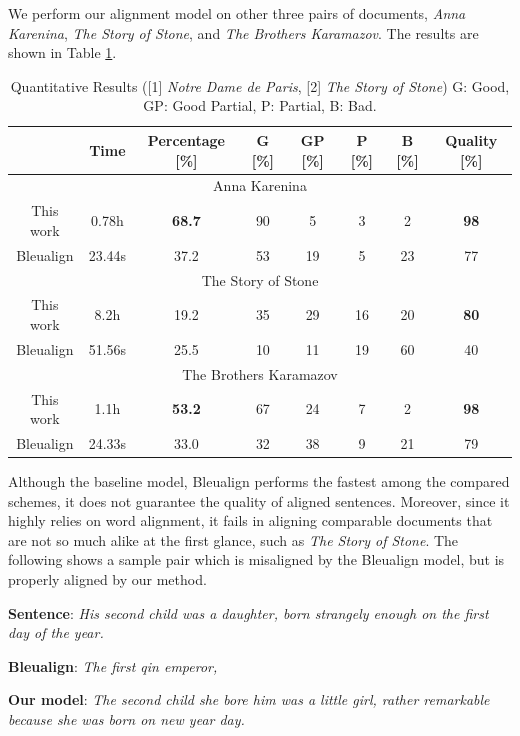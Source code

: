 \documentclass[runningheads]{llncs}
\begin{document}
\begin{spacing}{1.1}
We perform our alignment model on other three pairs of documents, \emph{Anna Karenina}, \emph{The Story of Stone}, and \emph{The Brothers Karamazov}. The results are shown in Table \ref{tb:8}.

\begin{table}[htbp]\footnotesize
	\centering
	\small
	\begin{tabular}{|c|c|c|c|c|c|c|c|}
		\hline
		\textbf{\diagbox{Model}{Result}} & Time & Percentage [\%] & G [\%] & GP [\%] & P [\%] & B [\%] & Quality [\%] \\
		\hline
		\multicolumn{8}{|c|}{Anna Karenina} \\
		\hline
		This work & 0.78h & \textbf{68.7} & 90 & 5 & 3 & 2 & \textbf{98} \\
		Bleualign & 23.44s & 37.2 & 53 & 19 & 5 & 23 & 77 \\
		\hline
		\multicolumn{8}{|c|}{The Story of Stone} \\
		\hline
		This work & 8.2h & 19.2 & 35 & 29 & 16 & 20 & \textbf{80} \\
		Bleualign & 51.56s & 25.5 & 10 & 11 & 19 & 60 & 40 \\
		\hline
		\multicolumn{8}{|c|}{The Brothers Karamazov} \\
		\hline
		This work & 1.1h & \textbf{53.2} & 67 & 24 & 7 & 2 & \textbf{98} \\
		Bleualign & 24.33s & 33.0 & 32 & 38 & 9 & 21 & 79 \\
		\hline
	\end{tabular}
	\caption{Quantitative Results ([1] \emph{Notre Dame de Paris}, [2] \emph{The Story of Stone}) G: Good, GP: Good Partial, P: Partial, B: Bad.}\label{tb:8}
\end{table}

Although the baseline model, Bleualign performs the fastest among the compared schemes, it does not guarantee the quality of aligned sentences. Moreover, since it highly relies on word alignment, it fails in aligning comparable documents that are not so much alike at the first glance, such as \emph{The Story of Stone}. The following shows a sample pair which is misaligned by the Bleualign model, but is properly aligned by our method.

\textbf{Sentence}: \emph{His second child was a daughter, born strangely enough on the first day of the year.}

\textbf{Bleualign}: \emph{The first qin emperor,}

\textbf{Our model}: \emph{The second child she bore him was a little girl, rather remarkable because she was born on new year day.}


\end{spacing}
\end{document}
